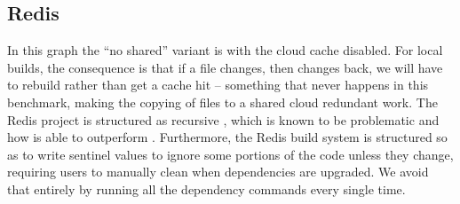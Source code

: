 \subsection{Redis}
\label{sec:eval:redis}


In this graph the ``no shared'' variant is \Rattle with the cloud cache disabled. For local builds, the consequence is that if a file changes, then changes back, we will have to rebuild rather than get a cache hit -- something that never happens in this benchmark, making the copying of files to a shared cloud redundant work. The Redis project is structured as recursive \Make, which is known to be problematic \cite{miller:recursive_make} and how \Rattle is able to outperform \Make. Furthermore, the Redis build system is structured so as to write sentinel values to ignore some portions of the code unless they change, requiring users to manually clean when dependencies are upgraded. We avoid that entirely by running all the dependency commands every single time.

